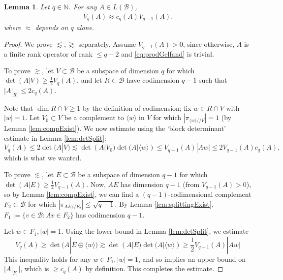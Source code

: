 \documentclass[11pt]{amsart}
\theoremstyle{theorem}
\newtheorem{lem}[thm]{Lemma}
\theoremstyle{definition}
\numberwithin{equation}{section}
\newcommand{\N}{\mathbb{N}}
\newcommand{\Bc}{\mathcal{B}}
\newcommand{\ds}{/ \! /}
\begin{document}
\begin{lem}\label{lem:gelfandProps}
Let $q \in \N$. For any $A \in L(\Bc)$,
\begin{align}\label{eq:prodGelfand}
V_q(A) \approx c_{q}(A) V_{q-1}(A) .
\end{align}
where $\approx$ depends on $q$ alone.
\end{lem}
\begin{proof}
We prove $\lesssim, \gtrsim$ separately. Assume $V_{q-1}(A) > 0$, since otherwise, $A$ is a finite rank operator of rank $\leq q - 2$ and \eqref{eq:prodGelfand} is trivial.

To prove $\gtrsim$, let $V \subset \Bc$ be a subspace of dimension $q$ for which $\det(A | V) \geq \frac{1}{2} V_q(A)$, and let $R \subset \Bc$ have codimension $q-1$ such that $|A|_R| \leq 2 c_q(A)$.


 Note that $\dim R \cap V \geq 1$ by the definition of codimension; fix $w \in R \cap V$ with $|w| = 1$. Let $V_0 \subset V$ be a complement to $\langle w \rangle$ in $V$ for which $|\pi_{\langle w \rangle \ds V}| = 1$ (by Lemma \ref{lem:compExist}). We now estimate using the `block determinant' estimate in Lemma \ref{lem:detSplit}:
\[
V_q(A) \leq 2 \det(A | V) \lesssim \det(A | V_0) \det(A | \langle w \rangle) \leq V_{q - 1}(A) |A w| \leq 2 V_{q - 1}(A) c_q(A),
\]
which is what we wanted.

To prove $\lesssim$, let $E \subset \Bc$ be a subspace of dimension $q-1$ for which $\det(A | E) \geq \frac{1}{2} V_{q-1}(A)$.  Now, $A E$ has dimension $q - 1$ (from $V_{q - 1}(A) > 0$), so by Lemma \ref{lem:compExist}, we can find a $(q-1)$-codimensional complement $F_2 \subset \Bc$ for which $|\pi_{A E \ds F_2}| \leq \sqrt{q-1}$. By Lemma \ref{lem:splittingExist}, $F_1 := \{v \in \Bc : A v \in F_2\}$ has codimension $q-1$.

Let $w \in F_1, |w| = 1$. Using the lower bound in Lemma \ref{lem:detSplit}, we estimate
\[
V_q(A) \geq \det(A | E \oplus \langle w \rangle) \gtrsim \det(A | E) \det(A | \langle w \rangle) \geq \frac{1}{2} V_{q -1 }(A) |A w|
\]
This inequality holds for any $w \in F_1, |w| = 1$, and so implies an upper bound on $|A|_{F_1}|$, which is $\geq c_q(A)$ by definition. This completes the estimate.
\end{proof}

\smallskip
{}
\end{document}
